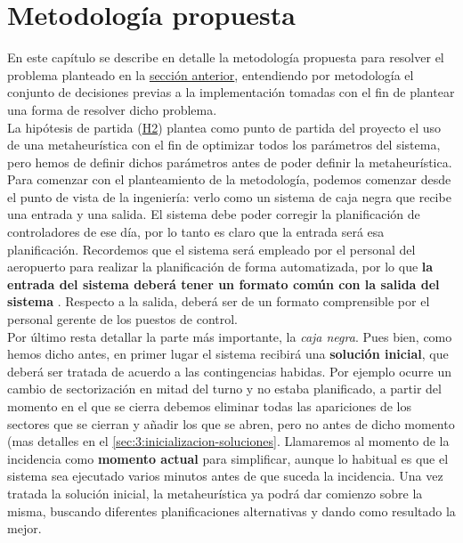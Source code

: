 \graphicspath{{capitulos/Capitulo3-Metodologia-propuesta/recursos/}}

\section{Metodología propuesta} \label{apartado:3}
En este capítulo se describe en detalle la metodología propuesta para resolver el problema planteado en la \hyperref[apartado:2]{sección anterior}, entendiendo por metodología el conjunto de decisiones previas a la implementación tomadas con el fin de plantear una forma de resolver dicho problema.
\\

La hipótesis de partida (\hyperref[H2]{H2}) plantea como punto de partida del proyecto el uso de una metaheurística con el fin de optimizar todos los parámetros del sistema, pero hemos de definir dichos parámetros antes de poder definir la metaheurística.
\\

Para comenzar con el planteamiento de la metodología, podemos comenzar desde el punto de vista de la ingeniería: verlo como un sistema de caja negra que recibe una entrada y una salida.
El sistema debe poder corregir la planificación de controladores de ese día, por lo tanto es claro que la entrada será esa planificación. Recordemos que el sistema \legacy{} será empleado por el personal del aeropuerto para realizar la planificación de forma automatizada, por lo que \textbf{la entrada del sistema deberá tener un formato común con la salida del sistema \legacy{}}.
Respecto a la salida, deberá ser de un formato comprensible por el personal gerente de los puestos de control.
\\

Por último resta detallar la parte más importante, la \textit{caja negra}. Pues bien, como hemos dicho antes, en primer lugar el sistema recibirá una \textbf{solución inicial}, que deberá ser tratada de acuerdo a las contingencias habidas. Por ejemplo ocurre un cambio de sectorización en mitad del turno y no estaba planificado, a partir del momento en el que se cierra debemos eliminar todas las apariciones de los sectores que se cierran y añadir los que se abren, pero no antes de dicho momento (mas detalles en el \autoref{sec:3:inicializacion-soluciones}. Llamaremos al momento de la incidencia como \textbf{momento actual} para simplificar, aunque lo habitual es que el sistema sea ejecutado varios minutos antes de que suceda la incidencia.
Una vez tratada la solución inicial, la metaheurística ya podrá dar comienzo sobre la misma, buscando diferentes planificaciones alternativas y dando como resultado la mejor. 
\\

